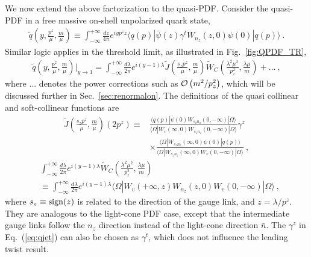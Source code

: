 \documentclass[a4paper,11pt]{article}
\begin{document}
We now extend the above factorization to the quasi-PDF. Consider the quasi-PDF in a free massive on-shell unpolarized quark state,
\begin{align}\label{eq:qpdfq}
    \tilde q\left( y, \frac{p^z}{\mu}, \frac{m}{\mu}\right) \equiv \int_{-\infty}^{+\infty} \frac{d z}{4\pi} e^{i y p^z z} 
    \langle q(p) | \bar{\psi}(z) \gamma^{t} W_{n_{z}}(z,0) \psi(0) | q(p) \rangle \ . 
\end{align}
Similar logic applies in the threshold limit, as illustrated in Fig.~\ref{fig:QPDF_TR},
\begin{align}\label{eq:TFqPDF}
\tilde q\left( y, \frac{p^z}{\mu}, \frac{m}{\mu}\right) \bigg|_{y \rightarrow 1} 
= \int_{-\infty}^{+\infty} \frac{d \lambda}{2\pi} e^{i (y-1) \lambda}
\tilde{J}\left(\frac{s_z p^z}{\mu}, \frac{m}{\mu}\right) \tilde W_C\left(\frac{\lambda^2 \mu^2}{p_z^2}, \frac{\lambda \mu}{m} \right) + ... \ ,
\end{align}
where $...$ denotes the power corrections such as ${\cal O}\left( m^2/p_z^2 \right)$, which will be discussed further in Sec.~\ref{sec:renormalon}. The definitions of the quasi collinear and soft-collinear functions are
\begin{align}\label{eq:qjet}
\tilde{J}\left(\frac{s_z p^z}{\mu}, \frac{m}{\mu}\right) (2p^z)
\equiv 
&\frac{\langle q(p)| \bar{\psi}(0) W_{s_z n_z}\left(0, -\infty \right) | \Omega \rangle}{\langle \Omega| W_{v}\left(\infty, 0\right) W_{s_z n_z}\left(0, -\infty\right) | \Omega \rangle} \gamma^{z} \nonumber\\
&\times \frac{\langle \Omega| W_{s_z n_z}\left(\infty, 0\right) \psi(0)| q(p) \rangle}{\langle \Omega| W_{s_z n_z}\left(\infty, 0\right) W_{v}\left(0,-\infty\right) | \Omega \rangle} \ ,
\end{align}
\begin{align}\label{eq:qsoft}
& \int_{-\infty}^{+\infty} \frac{d \lambda}{2 \pi} e^{i (y-1) \lambda}  \tilde W_C\left(\frac{\lambda^2 \mu^2}{p_z^2}, \frac{\lambda \mu}{m} \right) \nonumber\\
&\equiv \int_{-\infty}^{+\infty} \frac{d \lambda}{2 \pi} e^{i (y-1) \lambda}  \langle \Omega | W_{v}(+\infty, z) W_{n_z}(z, 0) W_{v}(0, -\infty) | \Omega \rangle \ ,
\end{align}
where $s_z \equiv {\rm sign}(z)$ is related to the direction of the gauge link, and $z=\lambda/p^z$. They are analogous to the light-cone PDF case, except that the intermediate gauge links follow the $n_z$ direction instead of the light-cone direction $\bar{n}$. The $\gamma^{z}$ in Eq.~(\ref{eq:qjet}) can also be chosen as $\gamma^t$, which does not influence the leading twist result. 
\end{document}

